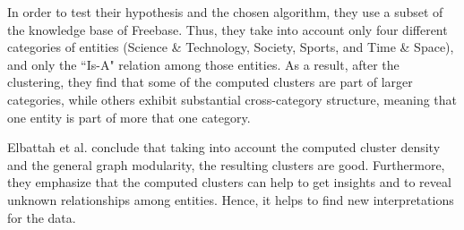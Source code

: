 \documentclass[runningheads]{llncs}
\begin{document}
In order to test their hypothesis and the chosen algorithm, they use a subset of the knowledge base of Freebase. Thus, they take into account only four different categories of entities (Science \& Technology, Society, Sports, and Time \& Space), and only the ``Is-A" relation among those entities. As a result, after the clustering, they find that some of the computed clusters are part of larger categories, while others exhibit substantial cross-category structure, meaning that one entity is part of more that one category. 

Elbattah et al. \cite{Elbattah} conclude that taking into account the computed cluster density and the general graph modularity, the resulting clusters are good. Furthermore, they emphasize that the computed clusters can help to get insights and to reveal unknown relationships among entities. Hence, it helps to find new interpretations for the data.
\end{document}
